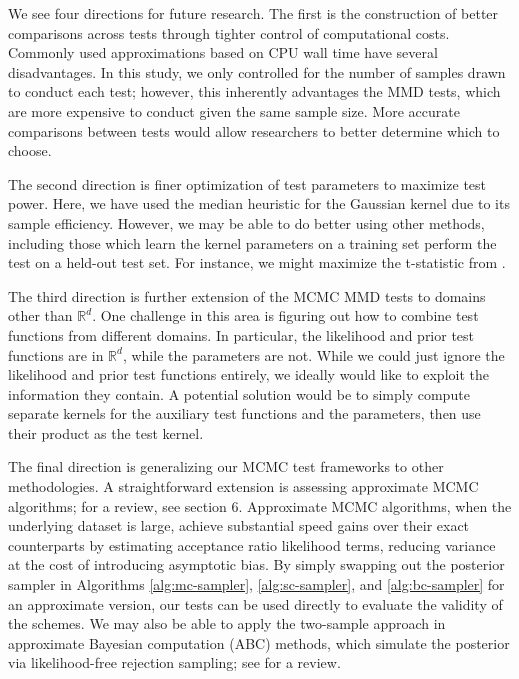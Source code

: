 \documentclass[a4paper,12pt]{article}
\begin{document}
We see four directions for future research. The first is the construction of better comparisons across tests through tighter control of computational costs. Commonly used approximations based on CPU wall time have several disadvantages. In this study, we only controlled for the number of samples drawn to conduct each test; however, this inherently advantages the MMD tests, which are more expensive to conduct given the same sample size. More accurate comparisons between tests would allow researchers to better determine which to choose.

The second direction is finer optimization of test parameters to maximize test power. Here, we have used the median heuristic for the Gaussian kernel due to its sample efficiency. However, we may be able to do better using other methods, including those which learn the kernel parameters on a training set perform the test on a held-out test set. For instance, we might maximize the t-statistic from \cite{sutherland_generative_2019}.

The third direction is further extension of the MCMC MMD tests to domains other than $\mathbb{R}^{d}$. One challenge in this area is figuring out how to combine test functions from different domains. In particular, the likelihood and prior test functions are in $\mathbb{R}^{d}$, while the parameters are not. While we could just ignore the likelihood and prior test functions entirely, we ideally would like to exploit the information they contain. A potential solution would be to simply compute separate kernels for the auxiliary test functions and the parameters, then use their product as the test kernel.

The final direction is generalizing our MCMC test frameworks to other methodologies. A straightforward extension is assessing approximate MCMC algorithms; for a review, see \cite{bardenet_markov_2015} section 6. Approximate MCMC algorithms, when the underlying dataset is large, achieve substantial speed gains over their exact counterparts by estimating acceptance ratio likelihood terms, reducing variance at the cost of introducing asymptotic bias. By simply swapping out the posterior sampler in Algorithms \ref{alg:mc-sampler}, \ref{alg:sc-sampler}, and \ref{alg:bc-sampler} for an approximate version, our tests can be used directly to evaluate the validity of the schemes. We may also be able to apply the two-sample approach in approximate Bayesian computation (ABC) methods, which simulate the posterior via likelihood-free rejection sampling; see \cite{grazian_review_2020} for a review.
\end{document}
